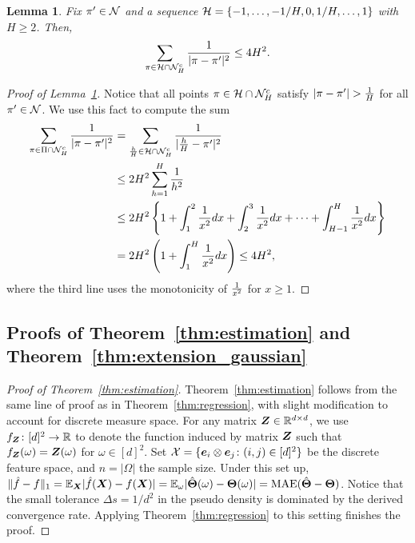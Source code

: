 \documentclass[11pt]{article}
\theoremstyle{plain}
\newtheorem{lem}{Lemma}
\theoremstyle{definition}
\begin{document}
\begin{lem}\label{lem:H}
Fix $\pi'\in\mathcal{N}$ and a sequence $\mathcal{H}=\{-1,\ldots,-1/H,0,1/H,\ldots,1\}$ with $H\geq 2$. Then, 
\[
\sum_{\pi \in \mathcal{H}\cap \mathcal{N}_H^c}{1\over 
|\pi-\pi'|^2}\leq 4H^2. 
\]
\end{lem}
\begin{proof}[Proof of Lemma~\ref{lem:H}]
Notice that all points $\pi\in\mathcal{H}\cap\mathcal{N}_H^c$ satisfy $|\pi-\pi'|>{1\over H}$ for all $\pi'\in\mathcal{N}$. We use this fact to compute the sum
\begin{align}
   \sum_{\pi \in \Pi\cap \mathcal{N}_H^c}{1\over |\pi-\pi'|^2}&= \sum_{\frac{h}{H}\in\mathcal{H}\cap \mathcal{N}_H^c } {1\over |\frac{h}{H}-\pi'|^2}\\
   &\leq 2H^2\sum_{h=1}^{H}{1 \over h^2}\\
 &\leq 2H^2\left\{ 1+\int_{1}^2{1\over x^2}dx+ \int_{2}^3{1\over x^2}dx+\cdots + \int_{H-1}^H{1\over x^2}dx\right\}\\
&= 2H^2\left(1+\int^{H}_{1}{1\over x^2}dx\right) \leq 4H^2,
\end{align}
 where the third line uses the monotonicity of ${1\over x^2}$ for $x\geq 1$. 
 \end{proof}


\subsection{Proofs of Theorem~\ref{thm:estimation} and Theorem~\ref{thm:extension_gaussian}}\label{sec:sub-Gaussian}
\begin{proof}[Proof of Theorem~\ref{thm:estimation}]
Theorem~\ref{thm:estimation} follows from the same line of proof as in Theorem~\ref{thm:regression}, with slight modification to account for discrete measure space. For any matrix $\bm Z\in\mathbb{R}^{d\times d}$, we use $f_{\bm Z}\colon[d]^2 \to \mathbb{R}$ to denote the function induced by matrix $\bm Z$ such that $f_{\bm Z}(\omega)=\bm Z(\omega)$ for $\omega\in[d]^2$. Set $\mathcal{X}=\{\bm{e}_i\otimes\bm{e}_j\colon(i,j)\in[d]^2\}$ be the discrete feature space, and $n=|\Omega|$ the sample size. Under this set up, $\lVert\hat f - f\rVert_1=\mathbb{E}_{\bm X}|\hat f (\bm X)- f(\bm X)| = \mathbb{E}_{\omega}|\hat {\bm{\Theta}}(\omega)-\bm{\Theta}(\omega)|=\textup{MAE}(\hat {\bm{\Theta}}-\bm{\Theta})$. Notice that the small tolerance $\Delta s=1/d^2$ in the pseudo density is dominated by the derived convergence rate. Applying Theorem~\ref{thm:regression} to this setting finishes the proof. 
\end{proof}
\end{document}
